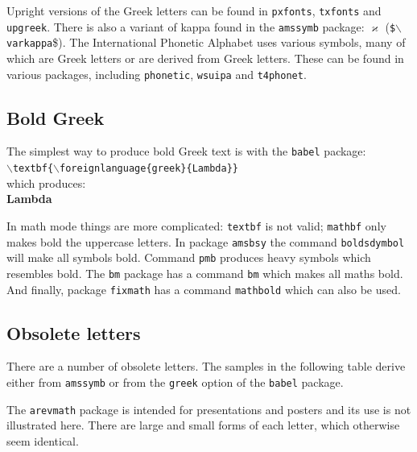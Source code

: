 \smallskip

Upright versions of the Greek letters can be found in \texttt{pxfonts}, \texttt{txfonts} and \texttt{upgreek}. 
There is also a variant of kappa found in the \texttt{amssymb} package: $\varkappa$ (\texttt{\$$\backslash$varkappa}\$).
The International Phonetic Alphabet uses various symbols, many of which are Greek letters or are derived from Greek letters. These can be found in various packages, including \texttt{phonetic}, \texttt{wsuipa} and \texttt{t4phonet}.

\subsection{Bold Greek}
The simplest way to produce bold Greek text is with the \texttt{babel} package: \\
\indent \texttt{$\backslash$textbf\{$\backslash$foreignlanguage\{greek\}\{Lambda\}\}} \\
which produces: \\
\indent \textbf{\foreignlanguage{greek}{Lambda}}

In math mode things are more complicated: \texttt{textbf} is not valid; \texttt{mathbf} only makes bold the uppercase letters. In package \texttt{amsbsy} the command \texttt{boldsdymbol} will make all symbols bold. Command \texttt{pmb} produces heavy symbols which  resembles bold. The \texttt{bm} package has a command \texttt{bm} which makes all maths bold. And finally, package \texttt{fixmath} has a command \texttt{mathbold} which can also be used.


\subsection{Obsolete letters}
There are a number of obsolete letters. The samples in the following table derive either from \texttt{amssymb} or from the \texttt{greek} option of the \texttt{babel} package.

The \texttt{arevmath} package is intended for presentations and posters and its use is not illustrated here. There are large and small forms of each letter, which otherwise seem identical.

